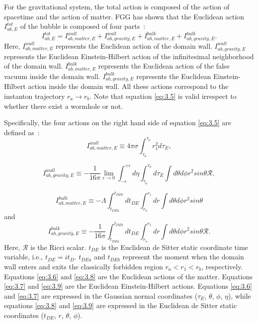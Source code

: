 \documentclass[12pt]{article}
\begin{document}
For the gravitational system, the total action is composed of the action of spacetime and the action of matter. FGG has shown that the Euclidean action $I^{tot}_{ab,E}$  of the bubble is composed of four parts~\cite{EAJ}:
\begin{equation}
\label{eq:3.5}%
I^{tot}_{ab,E}=I^{wall}_{ab,matter,E}+I^{wall}_{ab,gravity,E}+I^{bulk}_{ab,matter,E}+I^{bulk}_{ab,gravity,E}.
\end{equation}
Here, $I^{wall}_{ab,matter,E}$ represents the Euclidean action of the domain wall. $I^{wall}_{ab,gravity,E}$ represents the Euclidean Einstein-Hilbert action of the infinitesimal neighborhood of the domain wall. $I^{bulk}_{ab,matter,E}$ represents the Euclidean action of the false vacuum inside the domain wall. $I^{bulk}_{ab,gravity,E}$ represents the Euclidean Einstein-Hilbert action inside the domain wall. All these actions correspond to the instanton trajectory $r_{a}\rightarrow r_{b}$.  Note that equation \eqref{eq:3.5} is valid irrespect to whether there exist a wormhole or not.

Specifically, the four actions on the right hand side of equation \eqref{eq:3.5} are defined as~\cite{EAJ}:
\begin{equation}
\label{eq:3.6}%
I^{wall}_{ab,matter,E}\equiv 4\pi\sigma \int_{\tau_{a}}^{\tau_{b}}r_{1}^{2}d\tau_{E},
\end{equation}

\begin{equation}
\label{eq:3.7}%
I^{wall}_{ab,gravity,E}\equiv -\frac{1}{16\pi}\lim_{\epsilon\rightarrow0}\int_{-\epsilon}^{+\epsilon}d\eta\int_{\tau_{a}}^{\tau_{b}}d\tau_{E}\int d\theta d\phi r^{2}sin \theta\mathscr{R},
\end{equation}

\begin{equation}
\label{eq:3.8}%
I^{bulk}_{ab,matter,E}\equiv-\Lambda\int_{t_{DEa}}^{t_{DEb}}dt_{DE}\int_{r_{o}}^{r_{1}}dr\int d\theta d\phi r^{2}sin \theta
\end{equation}
and
\begin{equation}
\label{eq:3.9}%
I^{bulk}_{ab,gravity,E}\equiv -\frac{1}{16\pi}\int_{t_{DEa}}^{t_{DEb}}dt_{DE}\int_{r_{o}}^{r_{1}}dr\int d\theta d\phi r^{2}sin \theta\mathscr{R}.
\end{equation}
Here, $\mathscr{R}$ is the Ricci scalar. $t_{DE}$ is the Euclidean de Sitter static coordinate time variable, i.e.,  $t_{DE}=it_{D}$. $t_{DEa}$ and $t_{DEb}$ represent the moment when the domain wall enters and exits the classically forbidden region $r_{a}<r_{1}<r_{b}$, respectively. Equations \eqref{eq:3.6} and \eqref{eq:3.8} are the Euclidean actions of the matter. Equations \eqref{eq:3.7} and \eqref{eq:3.9} are the Euclidean Einstein-Hilbert actions. Equations \eqref{eq:3.6} and \eqref{eq:3.7} are expressed in the Gaussian normal coordinates ($\tau_{E}$, $\theta$, $\phi$, $\eta$), while equations \eqref{eq:3.8} and \eqref{eq:3.9} are expressed in the Euclidean de Sitter static coordinates ($t_{DE}$, $r$, $\theta$, $\phi$).
\end{document}
